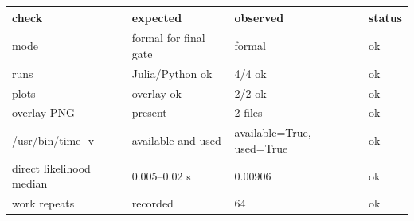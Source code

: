 \begin{tabular}{llll}
\toprule
check & expected & observed & status \\
\midrule
mode & formal for final gate & formal & ok \\
runs & Julia/Python ok & 4/4 ok & ok \\
plots & overlay ok & 2/2 ok & ok \\
overlay PNG & present & 2 files & ok \\
/usr/bin/time -v & available and used & available=True, used=True & ok \\
direct likelihood median & 0.005--0.02 s & 0.00906 & ok \\
work repeats & recorded & 64 & ok \\
\bottomrule
\end{tabular}
